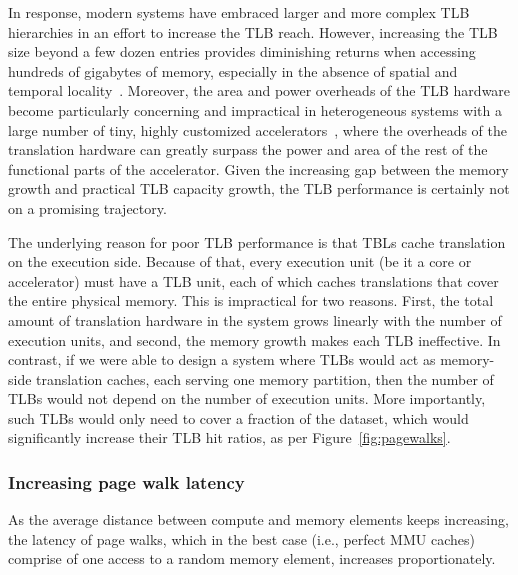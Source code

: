 In response, modern systems have embraced larger and more complex TLB hierarchies in an effort to increase the TLB reach. However, increasing the TLB size beyond a few dozen entries provides diminishing returns when accessing hundreds of gigabytes of memory, especially in the absence of spatial and temporal locality~\cite{}. Moreover, the area and power overheads of the TLB hardware become particularly concerning and impractical in heterogeneous systems with a large number of tiny, highly customized accelerators~\cite{}, where the overheads of the translation hardware can greatly surpass the power and area of the rest of the functional parts of the accelerator. Given the increasing gap between the memory growth and practical TLB capacity growth, the TLB performance is certainly not on a promising trajectory.

The underlying reason for poor TLB performance is that TBLs cache translation on the execution side. Because of that, every execution unit (be it a core or accelerator) must have a TLB unit, each of which caches translations that cover the entire physical memory. This is impractical for two reasons. First, the total amount of translation hardware in the system grows linearly with the number of execution units, and second, the memory growth makes each TLB ineffective. In contrast, if we were able to design a system where TLBs would act as memory-side translation caches, each serving one memory partition, then the number of TLBs would not depend on the number of execution units. More importantly, such TLBs would only need to cover a fraction of the dataset, which would significantly increase their TLB hit ratios, as per Figure~\ref{fig:pagewalks}.

\subsubsection{Increasing page walk latency}

As the average distance between compute and memory elements keeps increasing, the latency of page walks, which in the best case (i.e., perfect MMU caches) comprise of one access to a random memory element, increases proportionately.  



